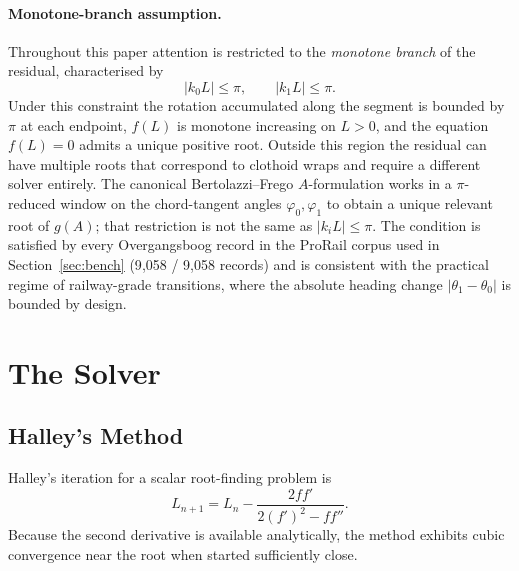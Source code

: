 \documentclass[11pt,a4paper]{article}
\begin{document}
\paragraph{Monotone-branch assumption.}
Throughout this paper attention is restricted to the \emph{monotone branch} of the residual, characterised by
\[
    |k_0 L| \le \pi, \qquad |k_1 L| \le \pi.
\]
Under this constraint the rotation accumulated along the segment is bounded by $\pi$ at each endpoint, $f(L)$ is monotone increasing on $L > 0$, and the equation $f(L)=0$ admits a unique positive root. Outside this region the residual can have multiple roots that correspond to clothoid wraps and require a different solver entirely. The canonical Bertolazzi--Frego $A$-formulation \citep{Bertolazzi2015, Bertolazzi2013arxiv} works in a $\pi$-reduced window on the chord-tangent angles $\varphi_0,\varphi_1$ to obtain a unique relevant root of $g(A)$; that restriction is not the same as $|k_i L|\le\pi$. The condition is satisfied by every Overgangsboog record in the ProRail corpus used in Section~\ref{sec:bench} (9{,}058 / 9{,}058 records) and is consistent with the practical regime of railway-grade transitions, where the absolute heading change $|\theta_1 - \theta_0|$ is bounded by design.

\section{The Solver}

\subsection{Halley's Method}
\label{sec:halley}
Halley's iteration for a scalar root-finding problem is
\[
L_{n+1} = L_n - \frac{2 f f'}{2(f')^2 - f f''}.
\]
Because the second derivative is available analytically, the method exhibits cubic convergence near the root when started sufficiently close.
\end{document}
